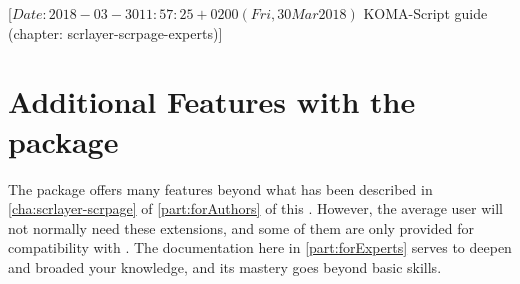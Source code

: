 %
%
%
%
%
%
%
%
% 
%
%
%
%

%
                 [$Date: 2018-03-30 11:57:25 +0200 (Fri, 30 Mar 2018) $
                  KOMA-Script guide (chapter: scrlayer-scrpage-experts)]


\chapter[{Additional Features of \Package{scrlayer-scrpage}}]
  {Additional Features with
    the  package}
%
\BeginIndexGroup
{}%
The  package offers many features beyond what has
been described in \autoref{cha:scrlayer-scrpage} of \autoref{part:forAuthors}
of this . However, the average user will not normally need
these extensions, and some of them are only provided for compatibility with
. The documentation here in \autoref{part:forExperts} serves
to deepen and broaded your knowledge, and its mastery goes beyond basic
skills.

